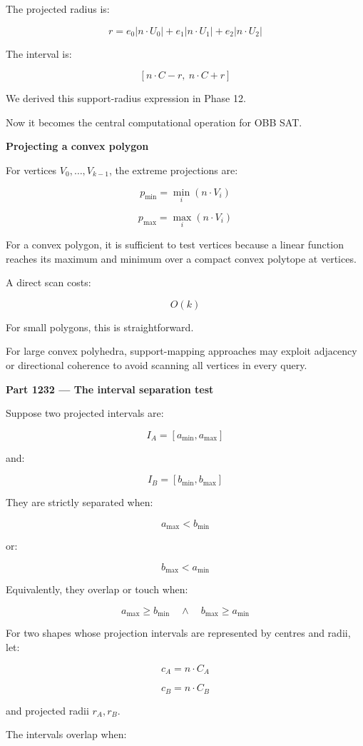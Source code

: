 The projected radius is:

\[
\boxed{ r= e_0|n\cdot U_0| + e_1|n\cdot U_1| + e_2|n\cdot U_2| }
\]

The interval is:

\[
\boxed{ [n\cdot C-r,\ n\cdot C+r] }
\]

We derived this support-radius expression in Phase 12.

Now it becomes the central computational operation for OBB SAT.

\textbf{Projecting a convex polygon}

For vertices \(V_0,\ldots,V_{k-1}\), the extreme projections are:

\[
p_{\min}=\min_i(n\cdot V_i)
\]

\[
p_{\max}=\max_i(n\cdot V_i)
\]

For a convex polygon, it is sufficient to test vertices because a linear function reaches its maximum and minimum over a compact convex polytope at vertices.

A direct scan costs:

\[
O(k)
\]

For small polygons, this is straightforward.

For large convex polyhedra, support-mapping approaches may exploit adjacency or directional coherence to avoid scanning all vertices in every query.

\textbf{Part 1232 --- The interval separation test}

Suppose two projected intervals are:

\[
I_A=[a_{\min},a_{\max}]
\]

and:

\[
I_B=[b_{\min},b_{\max}]
\]

They are strictly separated when:

\[
\boxed{ a_{\max}<b_{\min} }
\]

or:

\[
\boxed{ b_{\max}<a_{\min} }
\]

Equivalently, they overlap or touch when:

\[
\boxed{ a_{\max}\ge b_{\min} \quad\land\quad b_{\max}\ge a_{\min} }
\]

For two shapes whose projection intervals are represented by centres and radii, let:

\[
c_A=n\cdot C_A
\]

\[
c_B=n\cdot C_B
\]

and projected radii \(r_A,r_B\).

The intervals overlap when:

